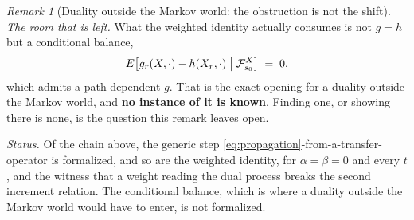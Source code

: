 \documentclass[11pt,a4paper]{article}
\theoremstyle{plain}
\theoremstyle{definition}
\theoremstyle{remark}
\newtheorem{remark}[theorem]{Remark}
\newcommand{\Filt}{\mathcal{F}}
\begin{document}
\begin{remark}[Duality outside the Markov world: the obstruction is not the shift]
  \emph{The room that is left.}  What the weighted identity actually consumes is
  not $g = h$ but a conditional balance,
  \[
    E\bigl[ g_r(X,\cdot) - h(X_r,\cdot) \bigm| \Filt^X_{s_0} \bigr] \;=\; 0 ,
  \]
  which admits a path-dependent $g$.  That is the exact opening for a duality
  outside the Markov world, and \textbf{no instance of it is known}.  Finding one,
  or showing there is none, is the question this remark leaves open.

  \emph{Status.}  Of the chain above, the generic step
  \eqref{eq:propagation}-from-a-transfer-operator is formalized, and so are
  the weighted identity, for $\alpha = \beta = 0$ and every $t$, and the
  witness that a weight reading the dual process breaks the second increment
  relation.  The conditional balance, which is where a duality outside the
  Markov world would have to enter, is not formalized.
\end{remark}
\end{document}
